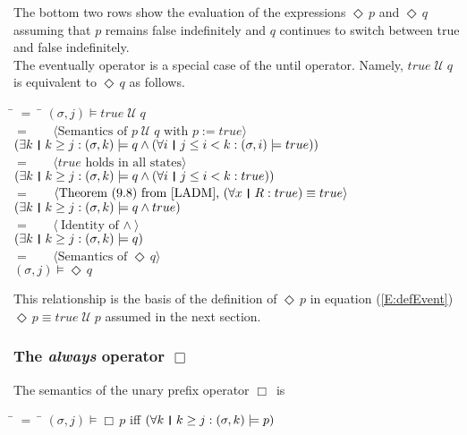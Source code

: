 \documentclass[fleqn, leqno]{article}
\newcommand{\lgap}{2pt} %
\newcommand{\mymathindent}{24pt} %
\newcommand{\Until}{\;\mathcal{U}\;}
\newcommand{\Event}{\Diamond\,}
\newcommand{\Always}{\Box\,}
\newcommand{\thedr}{\rule[-.25ex]{.32mm}{1.75ex}} %
\newcommand{\dr}{\;\,\thedr\,\;} %
\newcommand{\rb}{:} %
\newcommand{\all}{\forall} %
\newcommand{\ext}{\exists} %
\newcommand{\Gll} {\langle} %
\newcommand{\Ggg} {\rangle} %
\newcommand{\Hint}[1] {\ \ \ $\Gll \mbox{#1} \Ggg$ } %
\begin{document}
The bottom two rows show the evaluation of the expressions $\Event p$ and $\Event q$
assuming that $p$ remains false indefinitely and $q$ continues to switch between true and false indefinitely.\\

The eventually operator is a special case of the until operator.
Namely, $true \Until q$ is equivalent to $\Event q$ as follows.

\begin{tabbing}
\hspace{\mymathindent} \= $= \;$ \= \kill
\> \> $(\sigma, j) \models true\Until q$\\[\lgap]
\> $=$ \> \Hint{Semantics of $p\Until q$ with $p:=true$}\\[\lgap]
\> \> $(\ext k \dr k \ge j \rb (\sigma,k) \models q \land (\all i \dr j\le i < k \rb (\sigma,i) \models true))$\\[\lgap]
\> $=$ \> \Hint{$true$ holds in all states}\\[\lgap]
\> \> $(\ext k \dr k \ge j \rb (\sigma,k) \models q \land (\all i \dr j\le i < k \rb true))$\\[\lgap]
\> $=$ \> \Hint{Theorem (9.8) from \cite{LADM}, $(\all x\dr R\rb true)\equiv true$}\\[\lgap]
\> \> $(\ext k \dr k \ge j \rb (\sigma,k) \models q \land true)$\\[\lgap]
\> $=$ \> \Hint{Identity of $\land$}\\[\lgap]
\> \> $(\ext k \dr k \ge j \rb (\sigma,k) \models q)$\\[\lgap]
\> $=$ \> \Hint{Semantics of $\Event q$}\\[\lgap]
\> \> $(\sigma, j) \models \Event q$
\end{tabbing}

This relationship is the basis of the definition of $\Event p$ in equation (\ref{E:defEvent}) $\Event p \equiv true \Until p$
assumed in the next section.

\subsubsection*{The \textit{always} operator $\Always$}

The semantics of the unary prefix operator $\Always$ is

\begin{tabbing}
\hspace{\mymathindent} \= $= \;$ \= \kill
\> $(\sigma, j) \models \Always p$ \quad iff \quad $(\all k \dr k \ge j \rb (\sigma,k) \models p)$
\end{tabbing}
\end{document}
